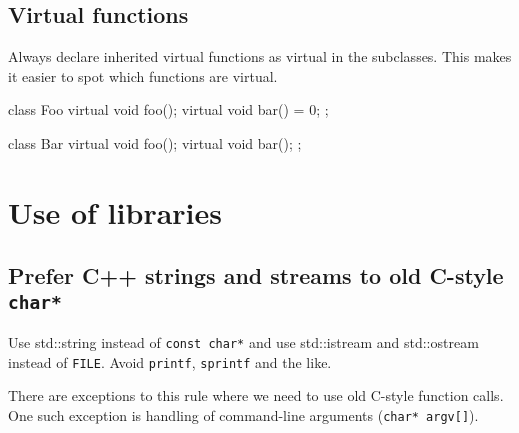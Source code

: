 \subsection{Virtual functions}

Always declare inherited virtual functions as virtual in the subclasses. This makes it
easier to spot which functions are virtual.

\begin{code}
class Foo
{
  virtual void foo();
  virtual void bar() = 0;
};

class Bar
{
  virtual void foo();
  virtual void bar();
};
\end{code}

\section{Use of libraries}

\subsection{Prefer C++ strings and streams to old C-style \texttt{char*}}

Use std::string instead of \texttt{const char*} and use std::istream and
std::ostream instead of \texttt{FILE}. Avoid \texttt{printf},
\texttt{sprintf} and the like.

There are exceptions to this rule where we need to use old C-style
function calls. One such exception is handling of command-line
arguments (\texttt{char* argv[]}).
